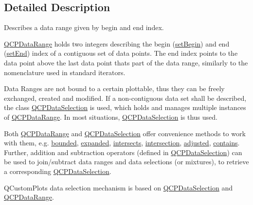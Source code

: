 \subsection{Detailed Description}
Describes a data range given by begin and end index. 

\mbox{\hyperlink{class_q_c_p_data_range}{Q\+C\+P\+Data\+Range}} holds two integers describing the begin (\mbox{\hyperlink{class_q_c_p_data_range_a54ff59048e01e46ac4aefafc844626c6}{set\+Begin}}) and end (\mbox{\hyperlink{class_q_c_p_data_range_a277f1a9eafe70b9184d9c00b641ae5de}{set\+End}}) index of a contiguous set of data points. The end index points to the data point above the last data point that\textquotesingle{}s part of the data range, similarly to the nomenclature used in standard iterators.

Data Ranges are not bound to a certain plottable, thus they can be freely exchanged, created and modified. If a non-\/contiguous data set shall be described, the class \mbox{\hyperlink{class_q_c_p_data_selection}{Q\+C\+P\+Data\+Selection}} is used, which holds and manages multiple instances of \mbox{\hyperlink{class_q_c_p_data_range}{Q\+C\+P\+Data\+Range}}. In most situations, \mbox{\hyperlink{class_q_c_p_data_selection}{Q\+C\+P\+Data\+Selection}} is thus used.

Both \mbox{\hyperlink{class_q_c_p_data_range}{Q\+C\+P\+Data\+Range}} and \mbox{\hyperlink{class_q_c_p_data_selection}{Q\+C\+P\+Data\+Selection}} offer convenience methods to work with them, e.\+g. \mbox{\hyperlink{class_q_c_p_data_range_a93529421d12fdd3a8bdb2b8061936352}{bounded}}, \mbox{\hyperlink{class_q_c_p_data_range_a36c8ad8acf177ffeb0a72c8d73030844}{expanded}}, \mbox{\hyperlink{class_q_c_p_data_range_a8a1c437f9beffd55621f48f961d7f679}{intersects}}, \mbox{\hyperlink{class_q_c_p_data_range_a84e1e03129dd52528efb4bac18d30183}{intersection}}, \mbox{\hyperlink{class_q_c_p_data_range_a279ed36602b39607699dc5652bcaf813}{adjusted}}, \mbox{\hyperlink{class_q_c_p_data_range_a13ca398776374a3160aa85433718b812}{contains}}. Further, addition and subtraction operators (defined in \mbox{\hyperlink{class_q_c_p_data_selection}{Q\+C\+P\+Data\+Selection}}) can be used to join/subtract data ranges and data selections (or mixtures), to retrieve a corresponding \mbox{\hyperlink{class_q_c_p_data_selection}{Q\+C\+P\+Data\+Selection}}.

Q\+Custom\+Plot\textquotesingle{}s data selection mechanism is based on \mbox{\hyperlink{class_q_c_p_data_selection}{Q\+C\+P\+Data\+Selection}} and \mbox{\hyperlink{class_q_c_p_data_range}{Q\+C\+P\+Data\+Range}}.

